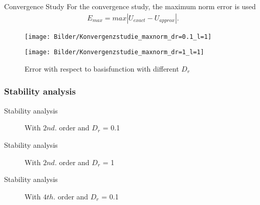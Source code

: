 \begin{frame}{Convergence Study}
	For the convergence study, the maximum norm error is used
	\begin{align*}
		E_{max} = max|U_{exact} - U_{approx}|.
	\end{align*}

	\begin{figure}
		\begin{minipage}{0.45\textwidth}
			\texttt{[image: Bilder/Konvergenzstudie\_maxnorm\_dr=0.1\_l=1]}
		\end{minipage}
		\hfill 
		\begin{minipage}{0.45\textwidth}
			\texttt{[image: Bilder/Konvergenzstudie\_maxnorm\_dr=1\_l=1]}
		\end{minipage}
		\caption{Error with respect to basisfunction with different $D_r$}
	\end{figure}
\end{frame}

\subsubsection{Stability analysis}

\begin{frame}{Stability analysis}
	\begin{figure}
		\centering
		\qquad
		\caption{With $2nd.$ order and $D_r$ = 0.1}
	\end{figure}
\end{frame}

\begin{frame}{Stability analysis}
	\begin{figure}
		\centering
		\qquad
		\caption{With $2nd.$ order and $D_r$ = 1}
	\end{figure}
\end{frame}

\begin{frame}{Stability analysis}
	\begin{figure}
		\centering
		\qquad
		\caption{With $4th.$ order and $D_r$ = 0.1}
	\end{figure}
\end{frame}

